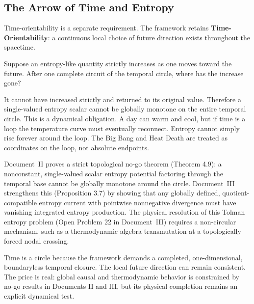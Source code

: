 \documentclass[11pt]{article}
\theoremstyle{canonstyle}
\begin{document}
\subsection{The Arrow of Time and Entropy}

Time-orientability is a separate requirement. The framework retains \textbf{Time-Orientability}: a continuous local choice of future direction exists throughout the spacetime.

\begin{reflect}
Suppose an entropy-like quantity strictly increases as one moves toward the future. After one complete circuit of the temporal circle, where has the increase gone?
\end{reflect}

It cannot have increased strictly and returned to its original value. Therefore a single-valued entropy scalar cannot be globally monotone on the entire temporal circle. This is a dynamical obligation. A day can warm and cool, but if time is a loop the temperature curve must eventually reconnect. Entropy cannot simply rise forever around the loop. The Big Bang and Heat Death are treated as coordinates on the loop, not absolute endpoints.

\begin{forthecurious}
Document~II proves a strict topological no-go theorem (Theorem 4.9): a nonconstant, single-valued scalar entropy potential factoring through the temporal base cannot be globally monotone around the circle. Document~III strengthens this (Proposition 3.7) by showing that any globally defined, quotient-compatible entropy current with pointwise nonnegative divergence must have vanishing integrated entropy production. The physical resolution of this Tolman entropy problem (Open Problem 22 in Document~III) requires a non-circular mechanism, such as a thermodynamic algebra transmutation at a topologically forced nodal crossing.
\end{forthecurious}

\begin{plainwords}
Time is a circle because the framework demands a completed, one-dimensional, boundaryless temporal closure. The local future direction can remain consistent. The price is real: global causal and thermodynamic behavior is constrained by no-go results in Documents II and III, but its physical completion remains an explicit dynamical test.
\end{plainwords}
\end{document}
